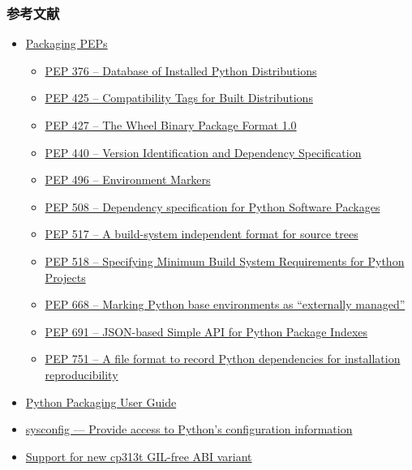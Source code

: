 \documentclass[aspectratio=169]{beamer}
\begin{document}
\begin{frame}
\frametitle{参考文献}
\begin{itemize}
\item \href{https://peps.python.org/topic/packaging/}{Packaging PEPs}
\begin{itemize}
\item \href{https://peps.python.org/pep-0376/}{PEP 376 – Database of Installed Python Distributions}
\item \href{https://peps.python.org/pep-0425/}{PEP 425 – Compatibility Tags for Built Distributions}
\item \href{https://peps.python.org/pep-0427/}{PEP 427 – The Wheel Binary Package Format 1.0}
\item \href{https://peps.python.org/pep-0440/}{PEP 440 – Version Identification and Dependency Specification}
\item \href{https://peps.python.org/pep-0496/}{PEP 496 – Environment Markers}
\item \href{https://peps.python.org/pep-0508/}{PEP 508 – Dependency specification for Python Software Packages}
\item \href{https://peps.python.org/pep-0517/}{PEP 517 – A build-system independent format for source trees}
\item \href{https://peps.python.org/pep-0518/}{PEP 518 – Specifying Minimum Build System Requirements for Python Projects}
\item \href{https://peps.python.org/pep-0668/}{PEP 668 – Marking Python base environments as “externally managed”}
\item \href{https://peps.python.org/pep-0691/}{PEP 691 – JSON-based Simple API for Python Package Indexes}
\item \href{https://peps.python.org/pep-0751/}{PEP 751 – A file format to record Python dependencies for installation reproducibility}
\end{itemize}
\item \href{https://packaging.python.org/}{Python Packaging User Guide}
\item \href{https://docs.python.org/3.13/library/sysconfig.html}{sysconfig — Provide access to Python’s configuration information}
\item \href{https://github.com/python-cffi/cffi/issues/40}{Support for new cp313t GIL-free ABI variant}
\end{itemize}
\end{frame}
\end{document}
